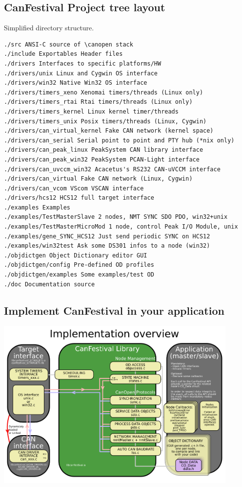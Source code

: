 \documentclass[12pt,english,a4paper]{book}
\newcommand{\canopen}{CANopen }
\begin{document}
\subsection{CanFestival Project tree layout}
Simplified directory structure.
\begin{verbatim}
./src ANSI-C source of \canopen stack
./include Exportables Header files
./drivers Interfaces to specific platforms/HW
./drivers/unix Linux and Cygwin OS interface
./drivers/win32 Native Win32 OS interface
./drivers/timers_xeno Xenomai timers/threads (Linux only)
./drivers/timers_rtai Rtai timers/threads (Linux only)
./drivers/timers_kernel Linux kernel timer/threads
./drivers/timers_unix Posix timers/threads (Linux, Cygwin)
./drivers/can_virtual_kernel Fake CAN network (kernel space)
./drivers/can_serial Serial point to point and PTY hub (*nix only)
./drivers/can_peak_linux PeakSystem CAN library interface
./drivers/can_peak_win32 PeakSystem PCAN-Light interface
./drivers/can_uvccm_win32 Acacetus's RS232 CAN-uVCCM interface
./drivers/can_virtual Fake CAN network (Linux, Cygwin)
./drivers/can_vcom VScom VSCAN interface
./drivers/hcs12 HCS12 full target interface
./examples Examples
./examples/TestMasterSlave 2 nodes, NMT SYNC SDO PDO, win32+unix
./examples/TestMasterMicroMod 1 node, control Peak I/O Module, unix
./examples/gene_SYNC_HCS12 Just send periodic SYNC on HCS12
./examples/win32test Ask some DS301 infos to a node (win32)
./objdictgen Object Dictionary editor GUI
./objdictgen/config Pre-defined OD profiles
./objdictgen/examples Some examples/test OD
./doc Documentation source
\end{verbatim}



\subsection{Implement CanFestival in your application}

\begin{center}
\includegraphics[width=12cm]{Pictures/10000201000003F9000002CF880931E7} 
\par\end{center}
\end{document}
